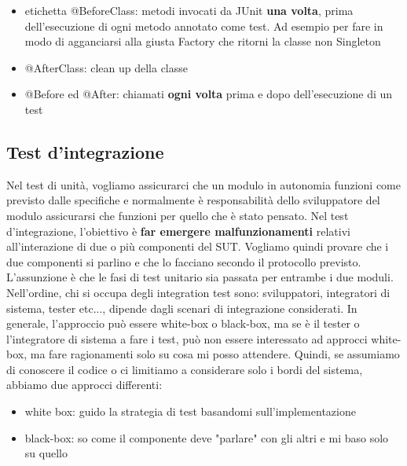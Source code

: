 \documentclass{article}
\begin{document}
\begin{itemize}
\item etichetta @BeforeClass: metodi invocati da JUnit \textbf{una volta}, prima dell'esecuzione di ogni metodo annotato come test. Ad esempio per fare in modo di agganciarsi alla giusta Factory che ritorni la classe non Singleton
\item @AfterClass: clean up della classe
\item @Before ed @After: chiamati \textbf{ogni volta} prima e dopo dell'esecuzione di un test
\end{itemize}
\subsection{Test d'integrazione}
Nel test di unità, vogliamo assicurarci che un modulo in autonomia funzioni come previsto dalle specifiche e normalmente è responsabilità dello sviluppatore del modulo assicurarsi che funzioni per quello che è stato pensato. Nel test d'integrazione, l'obiettivo è \textbf{far emergere malfunzionamenti} relativi all'interazione di due o più componenti del SUT. Vogliamo quindi provare che i due componenti si parlino e che lo facciano secondo il protocollo previsto. L'assunzione è che le fasi di test unitario sia passata per entrambe i due moduli. Nell'ordine, chi si occupa degli integration test sono: sviluppatori, integratori di sistema, tester etc..., dipende dagli scenari di integrazione considerati. In generale, l'approccio può essere white-box o black-box, ma se è il tester o l'integratore di sistema a fare i test, può non essere interessato ad approcci white-box, ma fare ragionamenti solo su cosa mi posso attendere. Quindi, se assumiamo di conoscere il codice o ci limitiamo a considerare solo i bordi del sistema, abbiamo due approcci differenti:
\begin{itemize}
\item white box: guido la strategia di test basandomi sull'implementazione
\item black-box: so come il componente deve "parlare" con gli altri e mi baso solo su quello
\end{itemize}
\end{document}
